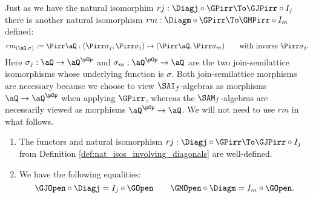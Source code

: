 \documentclass{article}
\begin{document}
\smallskip

\begin{note}
\item
Just as we have the natural isomorphim $rj : \Diagj \circ \GPirr \To \GJPirr \circ I_j$ there is another   natural isomorphism $rm : \Diagm \circ \GPirr \To \GMPirr \circ I_m$ defined:
\[
rm_{(\aQ,\sigma)} := \Pirr\aQ : (\Pirr\sigma_j,\Pirr\sigma_j) \to (\Pirr\aQ,\Pirr\sigma_m)
\qquad
\text{with inverse $\Pirr\sigma_j$}.
\]
Here $\sigma_j : \aQ \to \aQ^{\pOp}$ and $\sigma_m : \aQ^{\pOp} \to \aQ$ are the two join-semilattice isomorphisms whose underlying function is $\sigma$. Both join-semilattice morphisms are necessary because we choose to view $\SAI_f$-algebras as morphisms $\aQ \to \aQ^{\pOp}$ when applying $\GPirr$, whereas the $\SAM_f$-algebras are necessarily viewed as morphisms $\aQ^{\pOp} \to \aQ$. We will not need to use $rm$ in what follows. \endbox
\end{note}

\begin{lemma}
\label{lem:diagonal_nat_isos_equalities}
\item
\begin{enumerate}
\item
The functors and natural isomorphism $rj : \Diagj \circ \GPirr \To \GJPirr \circ I_j$ from Definition \ref{def:nat_isos_involving_diagonals} are well-defined.
\item
We have the following equalities:
\[
\GJOpen \circ \Diagj = I_j \circ \GOpen
\qquad
\GMOpen \circ \Diagm = I_m \circ \GOpen.
\]
\end{enumerate}
\end{lemma}
\end{document}
